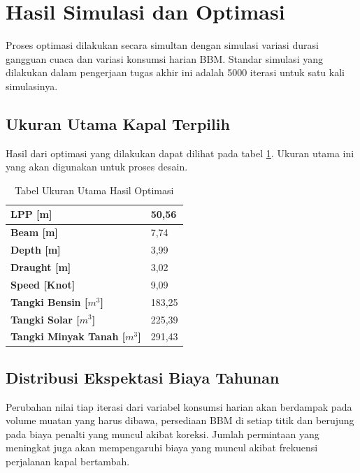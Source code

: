 \section{Hasil Simulasi dan Optimasi}
\label{sec:hasil-simulasi-optimasi}

Proses optimasi dilakukan secara simultan dengan simulasi variasi durasi gangguan cuaca dan variasi konsumsi harian BBM. Standar simulasi yang dilakukan dalam pengerjaan tugas akhir ini adalah 5000 iterasi untuk satu kali simulasinya.

\subsection{Ukuran Utama Kapal Terpilih}
\label{subsec:ukuran-utama}

Hasil dari optimasi yang dilakukan dapat dilihat pada tabel \ref{tabel-hasil-maindim}. Ukuran utama ini yang akan digunakan untuk proses desain.

\begin{table}[!ht]
    \centering
    \caption{Tabel Ukuran Utama Hasil Optimasi}
    \begin{tabular}{|l|l|}
    \hline
        \textbf{LPP [m]} & 50,56 \\ \hline
        \textbf{Beam  [m]} & 7,74 \\ \hline
        \textbf{Depth  [m]} & 3,99 \\ \hline
        \textbf{Draught [m]} & 3,02 \\ \hline
        \textbf{Speed [Knot]} & 9,09 \\ \hline
        \textbf{Tangki  Bensin [$m^3$]} & 183,25 \\ \hline
        \textbf{Tangki Solar [$m^3$]} & 225,39 \\ \hline
        \textbf{Tangki Minyak Tanah [$m^3$]} & 291,43 \\ \hline
    \end{tabular}
    \label{tabel-hasil-maindim}
\end{table}

\subsection{Distribusi Ekspektasi Biaya Tahunan}
\label{subsec:annual-cost-dist}

Perubahan nilai tiap iterasi dari variabel konsumsi harian akan berdampak pada volume muatan yang harus dibawa, persediaan BBM di setiap titik dan berujung pada biaya penalti yang muncul akibat koreksi. Jumlah permintaan yang meningkat juga akan mempengaruhi biaya yang muncul akibat frekuensi perjalanan kapal bertambah.

